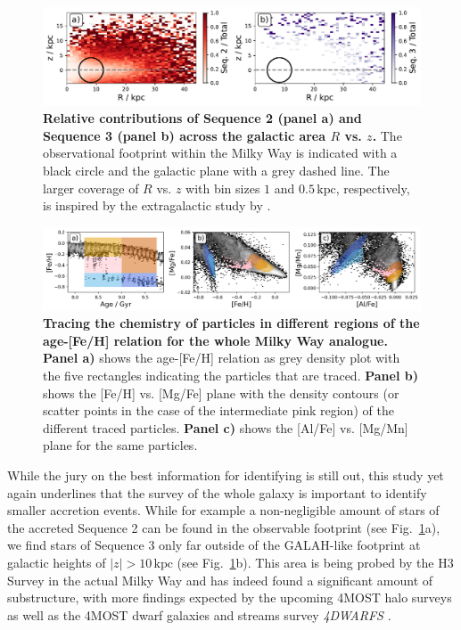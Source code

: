 \documentclass[fleqn,usenatbib]{mnras}
\begin{document}
\begin{figure}
	\includegraphics[width=\textwidth]{figures/accretion_rates.pdf}
    \caption{
    \textbf{Relative contributions of Sequence 2 (panel a) and Sequence 3 (panel b) across the galactic area $R$ vs. $z$.} The observational footprint within the Milky Way is indicated with a black circle and the galactic plane with a grey dashed line. The larger coverage of $R$ vs. $z$ with bin sizes $1$ and $0.5\,\mathrm{kpc}$, respectively, is inspired by the extragalactic study by \citet[][their Fig.~16]{Martig2021}.
    }
    \label{fig:accretion_rate}
\end{figure}

\begin{figure}
	\includegraphics[width=\textwidth]{figures/tracing_amr_regions_footprint.png}
\caption{
    \textbf{Tracing the chemistry of particles in different regions of the age-[Fe/H] relation for the whole Milky Way analogue.}
    \textbf{Panel a)} shows the age-[Fe/H] relation as grey density plot with the five rectangles indicating the particles that are traced.
    \textbf{Panel b)} shows the [Fe/H] vs. [Mg/Fe] plane with the density contours (or scatter points in the case of the intermediate pink region) of the different traced particles.
    \textbf{Panel c)} shows the [Al/Fe] vs. [Mg/Mn] plane for the same particles.
    }    \label{fig:tracing_amr_regions_footprint}
\end{figure}

While the jury on the best information for identifying is still out, this study yet again underlines that the survey of the whole galaxy is important to identify smaller accretion events. While for example a non-negligible amount of stars of the accreted Sequence 2 can be found in the observable footprint (see Fig.~\ref{fig:accretion_rate}a), we find stars of Sequence 3 only far outside of the GALAH-like footprint at galactic heights of $\vert z \vert > 10\,\mathrm{kpc}$ (see Fig.~\ref{fig:accretion_rate}b). This area is being probed by the H3 Survey \citep{Conroy2019} in the actual Milky Way and has indeed found a significant amount of substructure, with more findings expected by the upcoming 4MOST halo surveys \citep{4MOST_HR_Halo, 4MOST_LR_Halo} as well as the 4MOST dwarf galaxies and streams survey \textit{4DWARFS} \citep{4DWARFS2023}.
\end{document}
